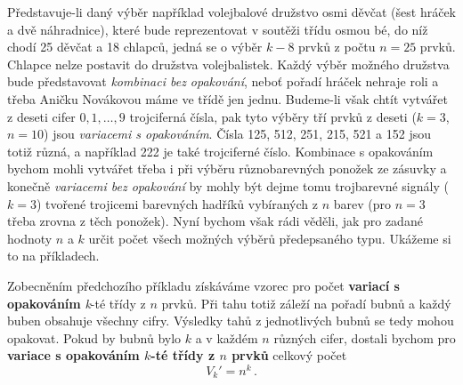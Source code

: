      Představuje-li daný výběr například volejbalové družstvo osmi děvčat (šest hráček a dvě 
      náhradnice), které bude reprezentovat v soutěži třídu osmou bé, do níž chodí \num{25} děvčat 
      a \num{18} chlapců, jedná se o výběr \(k - 8\) prvků z počtu \(n = 25\) prvků. Chlapce nelze 
      postavit do družstva volejbalistek. Každý výběr možného družstva bude představovat 
      \emph{kombinaci bez opakování}, neboť pořadí hráček nehraje roli a třeba Aničku Novákovou 
      máme ve třídě jen jednu. Budeme-li však chtít vytvářet z deseti cifer \(0, 1, \ldots, 9\) 
      trojciferná čísla, pak tyto výběry tří prvků z deseti (\(k = 3\), \(n = 10\)) jsou 
      \emph{variacemi s opakováním}. Čísla \num{125}, \num{512}, \num{251}, \num{215}, \num{521} a 
      \num{152} jsou totiž různá, a například \num{222} je také trojciferné číslo. Kombinace s 
      opakováním bychom mohli vytvářet třeba i při výběru různobarevných ponožek ze zásuvky a 
      konečně \emph{variacemi bez opakování} by mohly být dejme tomu trojbarevné signály (\(k = 
      3\)) tvořené trojicemi barevných hadříků vybíraných z \(n\) barev (pro \(n = 3\) třeba zrovna 
      z těch ponožek). Nyní bychom však rádi věděli, jak pro zadané hodnoty \(n\) a \(k\) určit 
      počet všech možných výběrů předepsaného typu. Ukážeme si to na příkladech.

      
      
      Zobecněním předchozího příkladu získáváme vzorec pro počet \textbf{variací s opakováním} 
      \emph{k}-té třídy z \(n\) prvků. Při tahu totiž záleží na pořadí bubnů a každý buben obsahuje 
      všechny cifry. Výsledky tahů z jednotlivých bubnů se tedy mohou opakovat. Pokud by bubnů bylo 
      \(k\) a v každém \(n\) různých cifer, dostali bychom pro \textbf{variace s opakováním 
      \(k\)-té třídy z \(n\) prvků} celkový počet
      \begin{equation}\label{mai:eq007}
        \boxed{V_k' = n^k}\, .
      \end{equation}

      
      
